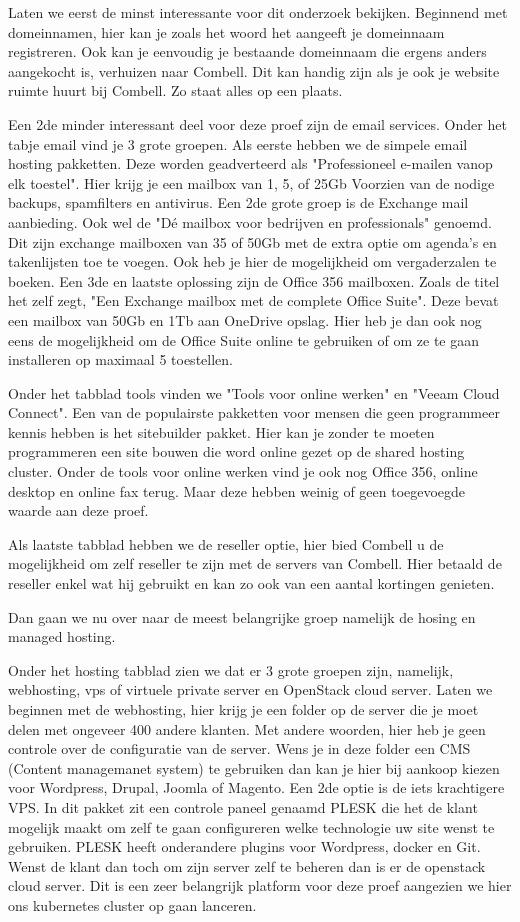 Laten we eerst de minst interessante voor dit onderzoek bekijken. Beginnend met domeinnamen, hier kan je zoals het woord het aangeeft je domeinnaam registreren. Ook kan je eenvoudig je bestaande domeinnaam die ergens anders aangekocht is, verhuizen naar Combell. Dit kan handig zijn als je ook je website ruimte huurt bij Combell. Zo staat alles op een plaats. 

Een 2de minder interessant deel voor deze proef zijn de email services. Onder het tabje email vind je 3 grote groepen. Als eerste hebben we de simpele email hosting pakketten. Deze worden geadverteerd als "Professioneel e-mailen vanop elk toestel". Hier krijg je een mailbox van 1, 5, of 25Gb Voorzien van de nodige backups, spamfilters en antivirus. Een 2de grote groep is de Exchange mail aanbieding. Ook wel de "Dé mailbox voor bedrijven en professionals" genoemd. Dit zijn exchange mailboxen van 35 of 50Gb met de extra optie om agenda's en takenlijsten toe te voegen. Ook heb je hier de mogelijkheid om vergaderzalen te boeken. Een 3de en laatste oplossing zijn de Office 356 mailboxen. Zoals de titel het zelf zegt, "Een Exchange mailbox met de complete Office Suite". Deze bevat een mailbox van 50Gb en 1Tb aan OneDrive opslag. Hier heb je dan ook nog eens de mogelijkheid om de Office Suite online te gebruiken of om ze te gaan installeren op maximaal 5 toestellen.

Onder het tabblad tools vinden we "Tools voor online werken" en "Veeam Cloud Connect". Een van de populairste pakketten voor mensen die geen programmeer kennis hebben is het sitebuilder pakket. Hier kan je zonder te moeten programmeren een site bouwen die word online gezet op de shared hosting cluster. Onder de tools voor online werken vind je ook nog Office 356, online desktop en online fax terug. Maar deze hebben weinig of geen toegevoegde waarde aan deze proef.

Als laatste tabblad hebben we de reseller optie, hier bied Combell u de mogelijkheid om zelf reseller te zijn met de servers van Combell. Hier betaald de reseller enkel wat hij gebruikt en kan zo ook van een aantal kortingen genieten.

Dan gaan we nu over naar de meest belangrijke groep namelijk de hosing en managed hosting. 

Onder het hosting tabblad zien we dat er 3 grote groepen zijn, namelijk, webhosting, vps of virtuele private server en OpenStack cloud server. 
Laten we beginnen met de webhosting, hier krijg je een folder op de server die je moet delen met ongeveer 400 andere klanten. Met andere woorden, hier heb je geen controle over de configuratie van de server. Wens je in deze folder een CMS (Content managemanet system) te gebruiken dan kan je hier bij aankoop kiezen voor Wordpress, Drupal, Joomla of Magento.
Een 2de optie is de iets krachtigere VPS. In dit pakket zit een controle paneel genaamd PLESK die het de klant mogelijk maakt om zelf te gaan configureren welke technologie uw site wenst te gebruiken. PLESK heeft onderandere plugins voor Wordpress, docker en Git. Wenst de klant dan toch om zijn server zelf te beheren dan is er de openstack cloud server. Dit is een zeer belangrijk platform voor deze proef aangezien we hier ons kubernetes cluster op gaan lanceren.


